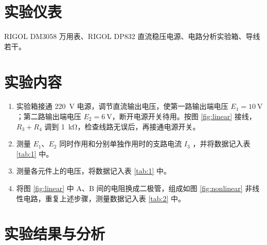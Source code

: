 \documentclass[a4paper,utf8]{article}
\begin{document}
\section{实验仪表}
    RIGOL DM3058 万用表、RIGOL DP832 直流稳压电源、电路分析实验箱、导线若干。
\section{实验内容}
\begin{enumerate}
    \item 实验箱接通 \SI{220}{\V} 电源，调节直流输出电压，使第一路输出端电压 $E_1 = \SI{10}{\V}$；第二路输出端电压 $E_2 = \SI{6}{\V}$，断开电源开关待用。按图 \ref{fig:linear} 接线， $R_3+R_4$ 调到 \SI{1}{\kilo\ohm}，检查线路无误后，再接通电源开关。
    \item 测量 $E_1$、$E_2$ 同时作用和分别单独作用时的支路电流 $I_3$ ，并将数据记入表 \ref{tab:1} 中。
    \item 测量各元件上的电压，将数据记入表 \ref{tab:1} 中。
    \item 将图 \ref{fig:linear} 中 A、B 间的电阻换成二极管，组成如图 \ref{fig:nonlinear} 非线性电路，重复上述步骤，测量数据记入表 \ref{tab:2} 中。
\end{enumerate}
\section{实验结果与分析}
\end{document}
